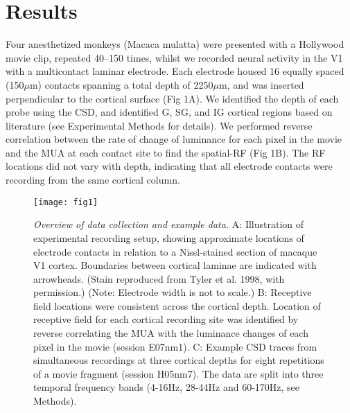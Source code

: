 \section{Results}
Four anesthetized monkeys (Macaca mulatta) were presented with a Hollywood movie clip, repeated 40--150 times, whilst we recorded neural activity in the \ac{V1} with a multicontact laminar electrode.
Each electrode housed 16 equally spaced (150\hspace{0.2em}$\mu$m) contacts spanning a total depth of 2250\hspace{0.2em}$\mu$m, and was inserted perpendicular to the cortical surface (Fig 1A).
We identified the depth of each probe using the \ac{CSD}, and identified \ac{G}, \ac{SG}, and \ac{IG} cortical regions based on literature (see Experimental Methods for details).
We performed reverse correlation between the rate of change of luminance for each pixel in the movie and the \ac{MUA} at each contact site to find the spatial-\ac{RF} (Fig 1B).
The \ac{RF} locations did not vary with depth, indicating that all electrode contacts were recording from the same cortical column.

\begin{figure}[htbp]
\centering \texttt{[image: fig1]}
%
\caption{%
\textit{Overview of data collection and example data.}
A: Illustration of experimental recording setup, showing approximate locations 
of electrode contacts in relation to a Nissl-stained section of macaque \ac{V1} 
cortex.
Boundaries between cortical laminae are indicated with arrowheads.
(Stain reproduced from Tyler et al. 1998, with permission.) (Note: Electrode 
width is not to scale.)
B: Receptive field locations were consistent across the 
cortical depth.
Location of receptive field for each cortical recording site 
was identified by reverse 
correlating the \ac{MUA} with the luminance changes of each 
pixel in the movie (session E07nm1).
C: Example \ac{CSD} traces from simultaneous recordings at three cortical depths for eight 
repetitions of a movie fragment (session H05nm7).
The data are split into three temporal frequency bands (4-16Hz, 28-44Hz and 60-170Hz, see Methods).
}%
\label{fig:lam_1}
%
\end{figure}

